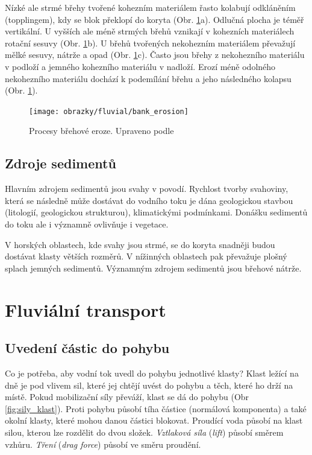 Nízké ale strmé břehy tvořené kohezním materiálem řasto kolabují odkláněním (topplingem), kdy se blok překlopí do koryta (Obr. \ref{fig:bankerosion}a). Odlučná plocha je téměř vertikální. U vyšších ale méně strmých břehů vznikají v kohezních materiálech rotační sesuvy (Obr. \ref{fig:bankerosion}b). U břehů tvořených nekohezním materiálem převažují mělké sesuvy, nátrže a opad (Obr. \ref{fig:bankerosion}c). Často jsou břehy z nekohezního materiálu v podloží a jemného kohezního materiálu v nadloží. Erozí méně odolného nekohezního materiálu dochází k podemílání břehu a jeho následného kolapsu (Obr. \ref{fig:bankerosion}).

\begin{figure}
	\centering
	\texttt{[image: obrazky/fluvial/bank\_erosion]}
	\caption{Procesy břehové eroze. Upraveno podle \textcite{charltonFundamentalsFluvialGeomorphology2007}}
	\label{fig:bankerosion}
\end{figure}

\subsection{Zdroje sedimentů}
Hlavním zdrojem sedimentů jsou svahy v povodí. Rychlost tvorby svahoviny, která se následně může dostávat do vodního toku je dána geologickou stavbou (litologií, geologickou strukturou), klimatickými podmínkami. Donášku sedimentů do toku ale i významně ovlivňuje i vegetace. 

V horských oblastech, kde svahy jsou strmé, se do koryta snadněji budou dostávat klasty větších rozměrů. V nížinných oblastech pak převažuje plošný splach jemných sedimentů. Významným zdrojem sedimentů jsou břehové nátrže. 

\section{Fluviální transport}
\subsection{Uvedení částic do pohybu}
Co je potřeba, aby vodní tok uvedl do pohybu jednotlivé klasty? Klast ležící na dně je pod vlivem sil, které jej chtějí uvést do pohybu a těch, které ho drží na místě. Pokud mobilizační síly převáží, klast se dá do pohybu (Obr \ref{fig:sily_klast}). Proti pohybu působí tíha částice (normálová komponenta) a také okolní klasty, které mohou danou částici blokovat. Proudící voda působí na klast silou, kterou lze rozdělit do dvou složek. \emph{Vztlaková síla} (\textit{lift}) působí směrem vzhůru. \emph{Tření} (\textit{drag force}) působí ve směru proudění. 

